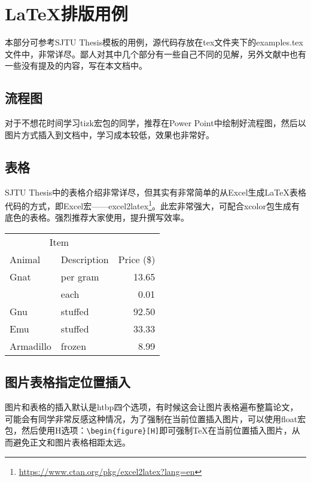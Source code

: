 
\chapter{\LaTeX 排版用例}\label{chap:example}

本部分可参考SJTU Thesis模板\cite{SJTUThesis}的用例，源代码存放在tex文件夹下的examples.tex文件中，非常详尽。鄙人对其中几个部分有一些自己不同的见解，另外文献中也有一些没有提及的内容，写在本文档中。

\section{流程图}

对于不想花时间学习tizk宏包的同学，推荐在Power Point中绘制好流程图，然后以图片方式插入到文档中，学习成本较低，效果也非常好。

\section{表格}

SJTU Thesis中的表格介绍非常详尽，但其实有非常简单的从Excel生成\LaTeX 表格代码的方式，即Excel宏——excel2latex\footnote{\url{https://www.ctan.org/pkg/excel2latex?lang=en}}。此宏非常强大，可配合xcolor包生成有底色的表格。强烈推荐大家使用，提升撰写效率。
    \begin{table}[H]
        \centering
        \begin{tabular}{@{}llr@{}} \toprule
            \multicolumn{2}{c}{Item} \\ \cmidrule(r){1-2}
            Animal & Description & Price (\$)\\ \midrule
            Gnat & per gram & 13.65 \\
            & each & 0.01 \\
            Gnu & stuffed & 92.50 \\
            Emu & stuffed & 33.33 \\
            Armadillo & frozen & 8.99 \\ \bottomrule
        \end{tabular}
    \end{table}

\section{图片表格指定位置插入}

图片和表格的插入默认是htbp四个选项，有时候这会让图片表格遍布整篇论文，可能会有同学非常反感这种情况，为了强制在当前位置插入图片，可以使用float宏包，然后使用H选项：\verb+\begin{figure}[H]+即可强制\TeX 在当前位置插入图片，从而避免正文和图片表格相距太远。
